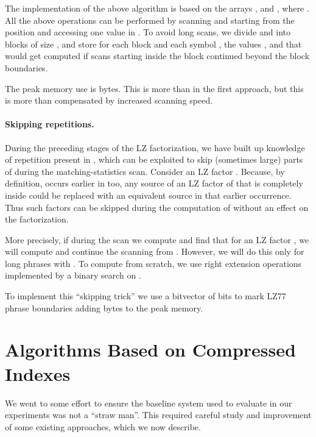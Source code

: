 \documentclass[runningheads]{llncs}
\begin{document}
{The implementation of the above algorithm is based on the arrays
,  and , where .
All the above operations can be performed by scanning  and
 starting from the position  and accessing one value in
. To avoid long scans, we divide  and  into blocks of
size , and store for each block and each symbol , the
values ,  and  that would get computed if scans
starting inside the block continued beyond the block boundaries.

The peak memory use is 
bytes. This is more than in the first approach, but this is more than
compensated by increased scanning speed.

\paragraph{Skipping repetitions.}

During the preceding stages of the LZ factorization, we have 
built up knowledge of repetition present in , which can be
exploited to skip (sometimes large) parts of  during the
matching-statistics scan.
Consider an LZ factor . 
Because, by definition,  occurs earlier in  too, any
source of an LZ factor of  that is completely inside 
could be replaced with an equivalent source in that earlier
occurrence.  Thus such factors can be skipped during the computation
of  without an effect on the factorization.

More precisely, if during the scan we compute 
and find that  
for an LZ factor , we will compute 
and continue the scanning from . However, we will do this only
for long phrases with .  To compute 
from scratch, we use right extension operations implemented by a
binary search on .

To implement this ``skipping trick'' we use a bitvector of  bits to
mark LZ77 phrase boundaries adding  bytes to the peak memory.

\section{Algorithms Based on Compressed Indexes}
\label{sec-oldalgs}

We went to some effort to ensure the baseline system used to evaluate
 in our experiments was not a ``straw man''. This required
careful study and improvement of some existing approaches, which we
now describe.

}
\end{document}

